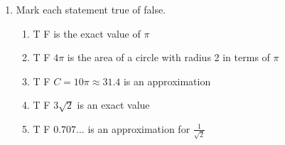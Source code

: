 \begin{enumerate}
\item Mark each statement true of false.
\begin{enumerate}[itemsep=0.3cm]
  \item T \quad F  is the exact value of $\pi$
  \item T \quad F \qquad $4\pi$ is the area of a circle with radius 2 in terms of $\pi$
  \item T \quad F \qquad $C = 10\pi \approx 31.4$ is an approximation
  \item T \quad F \qquad $3\sqrt{2}$ is an exact value
  \item T \quad F \qquad $0.707\dots$ is an approximation for $\displaystyle \frac{1}{\sqrt{2}}$
\end{enumerate}

\end{enumerate}
